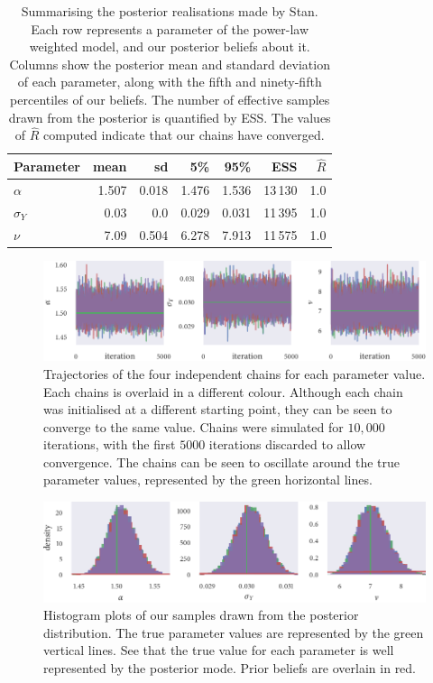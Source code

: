 \begin{table}[p]
  \begin{tabular}{@{}lrrrrrr@{}}
    \toprule
    Parameter    & mean  & sd    & 5\%   & 95\%  & ESS & $\widehat{R}$ \\
    \midrule
    $\alpha$     & 1.507 & 0.018 & 1.476 & 1.536 & 13\,130            & 1.0       \\
    $\sigma_{Y}$ & 0.03  & 0.0   & 0.029 & 0.031 & 11\,395            & 1.0       \\
    $\nu$        & 7.09  & 0.504 & 6.278 & 7.913 & 11\,575            & 1.0       \\
    \bottomrule
  \end{tabular}
  \caption{Summarising the posterior realisations made by Stan. Each row represents a
      parameter of the power-law weighted model, and our posterior beliefs about it.
      Columns show the posterior mean and standard deviation of each parameter, along with
      the fifth and ninety-fifth percentiles of our beliefs. The number of effective
      samples drawn from the posterior is quantified by ESS. The values of
      $\widehat{R}$ computed indicate that our chains have converged.}
  \label{tab:power_sim_study_summary}
\end{table}
\begin{figure}[p]
  \includegraphics{stan_power_trace.pdf}
  \caption{Trajectories of the four independent chains for each parameter value. Each 
  chains is overlaid in a different colour. Although each chain was initialised at a
  different starting point, they can be seen to converge to the same value. Chains were
  simulated for $10,000$ iterations, with the first $5000$ iterations discarded to allow
  convergence. The chains can be seen to oscillate around the true parameter values,
  represented by the green horizontal lines.}
  \label{fig:power_sim_study_chains}
\end{figure}
\begin{figure}[p]
  \includegraphics{stan_power_hist.pdf}
  \caption{Histogram plots of our samples drawn from the posterior distribution. The true
  parameter values are represented by the green vertical lines. See that the true value
  for each parameter is well represented by the posterior mode. Prior beliefs are overlain
  in red.}
  \label{fig:power_sim_study_hists}
\end{figure}

